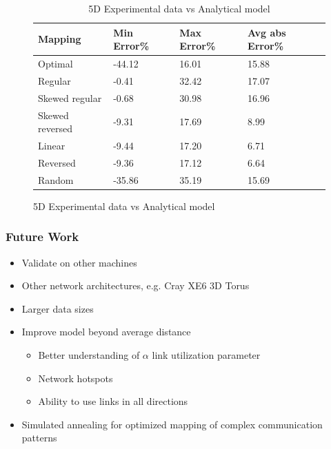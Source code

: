 \documentclass{beamer}
\begin{document}
\begin{frame}[fragile]
\begin{figure}
\caption{Analytical model effectiveness}
\begin{table}
  \caption{5D Experimental data vs Analytical model
    \label{table:data vs model 5d}}
  {\footnotesize
    \begin{tabular}{ | l | l | l | p{1.5cm} |}
    \hline
    Mapping         &    Min Error\% &   Max Error\% & Avg abs Error\%\\ \hline
    Optimal         &         -44.12 & 16.01 & 15.88\\ \hline
    Regular         &         -0.41  & 32.42 & 17.07\\ \hline
    Skewed regular  &         -0.68  & 30.98 & 16.96\\ \hline
    Skewed reversed &         -9.31  & 17.69 & 8.99\\ \hline
    Linear          &         -9.44  & 17.20 & 6.71\\ \hline
    Reversed        &         -9.36  & 17.12 & 6.64\\ \hline
    Random          &         -35.86 & 35.19 & 15.69\\ \hline

    \hline
    \end{tabular}
  }
\end{table}

\end{figure}
\end{frame}

\begin{frame}
\frametitle{Future Work}
\begin{itemize}
  \item Validate on other machines
  \item Other network architectures, e.g. Cray XE6 3D Torus
  \item Larger data sizes
  \item Improve model beyond average distance
  \begin{itemize}
    \item Better understanding of $\alpha$ link utilization parameter
    \item Network hotspots
    \item Ability to use links in all directions
  \end{itemize}
  \item Simulated annealing for optimized mapping of complex communication patterns
\end{itemize}
\end{frame}
\end{document}
